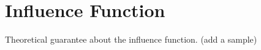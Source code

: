 \section{Influence Function} 
\label{sec:datagen}

Theoretical guarantee about the influence function. (add a sample) 





